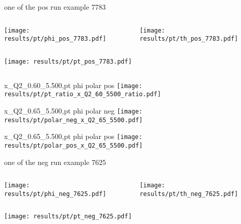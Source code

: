 \begin{frame}{one of the pos run example 7783}
\begin{columns}
\begin{column}[T]{0.5\textwidth}
\texttt{[image: results/pt/phi\_pos\_7783.pdf]}
\end{column}
\begin{column}[T]{0.5\textwidth}
\texttt{[image: results/pt/th\_pos\_7783.pdf]}
\end{column}
\end{columns}
\begin{columns}
\begin{column}[T]{0.5\textwidth}
\texttt{[image: results/pt/pt\_pos\_7783.pdf]}
\end{column}
\begin{column}[T]{0.5\textwidth}
\end{column}
\end{columns}
\end{frame}
\begin{frame}{x\_Q2\_0.60\_5.500,pt phi polar pos}
\texttt{[image: results/pt/pt\_ratio\_x\_Q2\_60\_5500\_ratio.pdf]}
\end{frame}
\begin{frame}{x\_Q2\_0.65\_5.500,pt phi polar neg}
\texttt{[image: results/pt/polar\_neg\_x\_Q2\_65\_5500.pdf]}
\end{frame}
\begin{frame}{x\_Q2\_0.65\_5.500,pt phi polar pos}
\texttt{[image: results/pt/polar\_pos\_x\_Q2\_65\_5500.pdf]}
\end{frame}
\begin{frame}{one of the neg run example 7625}
\begin{columns}
\begin{column}[T]{0.5\textwidth}
\texttt{[image: results/pt/phi\_neg\_7625.pdf]}
\end{column}
\begin{column}[T]{0.5\textwidth}
\texttt{[image: results/pt/th\_neg\_7625.pdf]}
\end{column}
\end{columns}
\texttt{[image: results/pt/pt\_neg\_7625.pdf]}
\end{frame}
